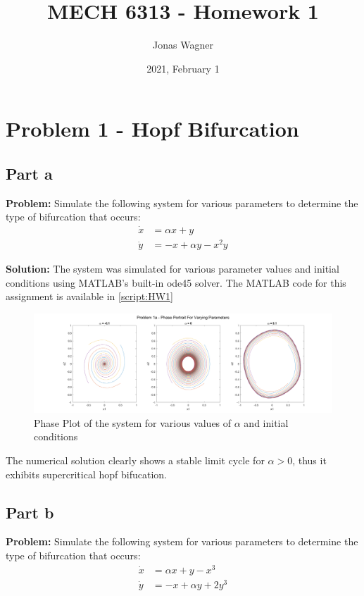 \documentclass[letter]{article}
\title{MECH 6313 - Homework 1}
\author{Jonas Wagner}
\date{2021, February 1}
\begin{document}
\maketitle


\section{Problem 1 - Hopf Bifurcation}
\subsection{Part a}
\textbf{Problem:}
Simulate the following system for various parameters to determine the type of bifurcation that occurs:
\begin{equation}
	\begin{aligned}
		\dot{x} &= \alpha x + y\\
		\dot{y} &= -x + \alpha y - x^2 y
	\end{aligned}
\end{equation}

\noindent
\textbf{Solution:}
The system was simulated for various parameter values and initial conditions using MATLAB's built-in ode45 solver. The MATLAB code for this assignment is available in \appendixname \ref{script:HW1}\\

\begin{figure}[h]
	\centering
	\includegraphics[width=1\linewidth]{fig/pblm1a}
	\caption{Phase Plot of the system for various values of $\alpha$ and initial conditions}
	\label{fig:pblm1a}
\end{figure}

The numerical solution clearly shows a stable limit cycle for $\alpha > 0$, thus it exhibits supercritical hopf bifucation.



\newpage
\subsection{Part b}
\textbf{Problem:}
Simulate the following system for various parameters to determine the type of bifurcation that occurs:
\begin{equation}
	\begin{aligned}
		\dot{x} &= \alpha x + y - x^3\\
		\dot{y} &= -x + \alpha y + 2 y^3
	\end{aligned}
\end{equation}
\end{document}
